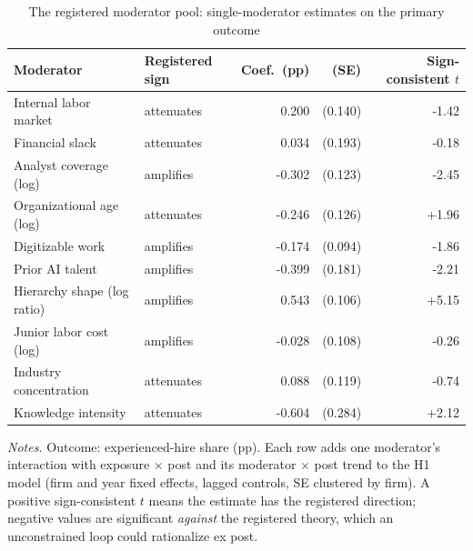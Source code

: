 \begin{table}[!htbp]\centering\footnotesize
\caption{The registered moderator pool: single-moderator estimates on the primary outcome}\label{tab:pool}
\begin{tabular}{llrrr}
\toprule
Moderator & Registered sign & Coef.\ (pp) & (SE) & Sign-consistent $t$ \\
\midrule
Internal labor market & attenuates & 0.200 & (0.140) & -1.42 \\
Financial slack & attenuates & 0.034 & (0.193) & -0.18 \\
Analyst coverage (log) & amplifies & -0.302 & (0.123) & -2.45 \\
Organizational age (log) & attenuates & -0.246 & (0.126) & +1.96 \\
Digitizable work & amplifies & -0.174 & (0.094) & -1.86 \\
Prior AI talent & amplifies & -0.399 & (0.181) & -2.21 \\
Hierarchy shape (log ratio) & amplifies & 0.543 & (0.106) & +5.15 \\
Junior labor cost (log) & amplifies & -0.028 & (0.108) & -0.26 \\
Industry concentration & attenuates & 0.088 & (0.119) & -0.74 \\
Knowledge intensity & attenuates & -0.604 & (0.284) & +2.12 \\
\bottomrule
\end{tabular}
\begin{minipage}{0.95\linewidth}\vspace{2pt}\scriptsize\textit{Notes.} Outcome: experienced-hire share (pp). Each row adds one moderator's interaction with exposure $\times$ post and its moderator $\times$ post trend to the H1 model (firm and year fixed effects, lagged controls, SE clustered by firm). A positive sign-consistent $t$ means the estimate has the registered direction; negative values are significant \emph{against} the registered theory, which an unconstrained loop could rationalize ex post.\end{minipage}
\end{table}